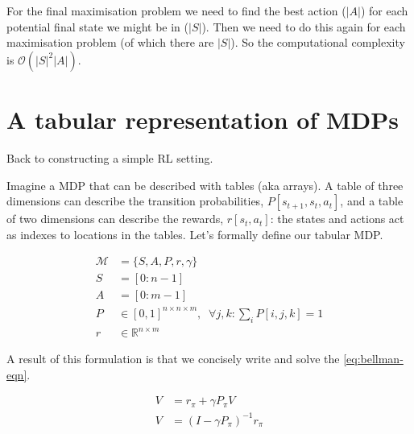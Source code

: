 For the final maximisation problem we need to find the best action ($|A|$) for each potential final state we might be in ($|S|$).
Then we need to do this again for each maximisation problem (of which there are $|S|$).
So the computational complexity is $\mathcal O(|S|^2|A|)$.

\section{A tabular representation of MDPs}

Back to constructing a simple RL setting.

Imagine a MDP that can be described with tables (aka arrays). A table of
three dimensions can describe the transition probabilities, $P[s_{t+1}, s_t, a_t]$,
and a table of two dimensions can describe the rewards, $r[s_t, a_t]$: the
states and actions act as indexes to locations in the tables.
Let's formally define our tabular MDP. \footnotemark[23]


\begin{align}
\mathcal M &= \{S, A, P, r, \gamma\}\; \tag{the MDP}\\
S &= [0:n-1] \tag{the state space}\\
A &= [0:m-1] \tag{the action space}\\
P &\in [0,1]^{n\times n \times m}, \;\;\forall j, k : \sum_i P[i, j, k] = 1 \tag{the transition fn}\\
r &\in \mathbb R^{n\times m} \tag{the reward fn}
\end{align}

A result of this formulation is that we concisely write and solve the \eqref{eq:bellman-eqn}. \footnotemark[0]


\begin{align}
V &= r_{\pi} + \gamma P_{\pi} V \tag{tabular Bellman eqn}\\
V &= (I-\gamma P_{\pi})^{-1}r_{\pi}  \label{eq:value-functional}\tag{Value functional}
\end{align}

